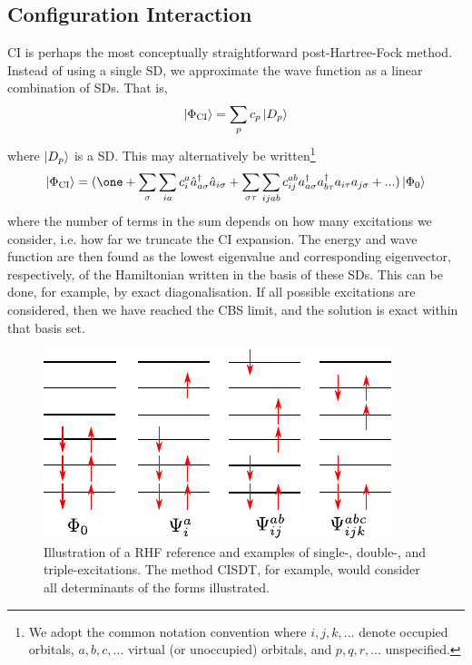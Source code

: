 \subsection{Configuration Interaction}
\label{sec:ci}

\Gls{CI} is perhaps the most conceptually straightforward post-Hartree-Fock method. Instead of using a single \gls{SD}, we approximate the wave function as a linear combination of \glspl{SD}. That is,
\begin{equation}
\ket{\Phi_\mathrm{CI}} = \sum_p c_p\ket{D_p}
\end{equation}
where $\ket{D_p}$ is a \gls{SD}. This may alternatively be written\footnote{We adopt the common notation convention where $i,j,k,...$ denote occupied orbitals, $a,b,c,...$ virtual (or unoccupied) orbitals, and $p,q,r, ...$ unspecified.}
\begin{equation}
\label{eq:ci}
\ket{\Phi_\mathrm{CI}} = (\one + \sum_\sigma\sum_{ia}c_i^a\hat a_{a\sigma}^\dag\hat a_{i\sigma} +
\sum_{\sigma\tau}\sum_{ijab}c_{ij}^{ab} a_{a\sigma}^\dag a_{b\tau}^\dag a_{i\tau} a_{j\sigma}+...)\ket{\Phi_0}
\end{equation}
where the number of terms in the sum depends on how many excitations we consider, i.e. how far we truncate the \gls{CI} expansion. The energy and wave function are then found as the lowest eigenvalue and corresponding eigenvector, respectively, of the Hamiltonian written in the basis of these \glspl{SD}. This can be done, for example, by exact diagonalisation. If all possible excitations are considered, then we have reached the \gls{CBS} limit, and the solution is exact within that basis set.

\begin{figure}[htbp]
    \centering
    \includegraphics{figures/intro/configurations.pdf}
    \caption{Illustration of a \gls{RHF} reference and examples of single-, double-, and triple-excitations. The method CISDT, for example, would consider all determinants of the forms illustrated.}
    \label{fig:excitations}
\end{figure}

